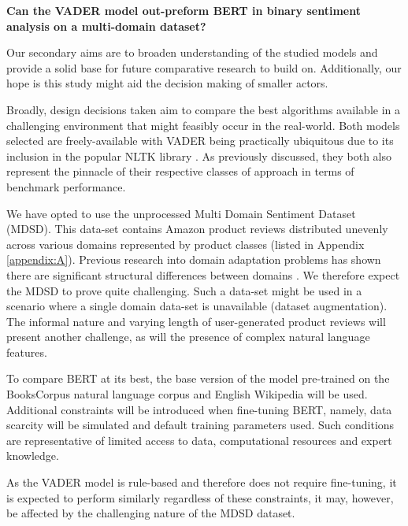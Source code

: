 \documentclass{csfourzero}
\begin{document}
\smallskip
\begin{center}
   \textbf{Can the VADER model out-preform BERT in binary sentiment analysis on a multi-domain dataset?}
\end{center}
\smallskip

Our secondary aims are to broaden understanding of the studied models and provide a solid base for future comparative research to build on. Additionally, our hope is this study might aid the decision making of smaller actors. 

\par
Broadly, design decisions taken aim to compare the best algorithms available in a challenging environment that might feasibly occur in the real-world. Both models selected are freely-available with VADER being practically ubiquitous due to its inclusion in the popular NLTK library \cite{nltk}. As previously discussed, they both also represent the pinnacle of their respective classes of approach in terms of benchmark performance.
\par

We have opted to use the unprocessed Multi Domain Sentiment Dataset (MDSD). This data-set contains Amazon product reviews distributed unevenly across various domains represented by product classes (listed in Appendix \ref{appendix:A}). Previous research into domain adaptation problems has shown there are significant structural differences between domains \cite{domainadaptation}. We therefore expect the MDSD to prove quite challenging. Such a data-set might be used in a scenario where a single domain data-set is unavailable (dataset augmentation). The informal nature and varying length of user-generated product reviews will present another challenge, as will the presence of complex natural language features.
\par
To compare BERT at its best, the base version of the model pre-trained on the BooksCorpus natural language corpus and English Wikipedia \cite{booksCorpus} will be used. Additional constraints will be introduced when fine-tuning BERT, namely, data scarcity will be simulated and default training parameters used. Such conditions are representative of limited access to data, computational resources and expert knowledge. 
\par
As the VADER model is rule-based and therefore does not require fine-tuning, it is expected to perform similarly regardless of these constraints, it may, however, be affected by the challenging nature of the MDSD dataset.

\par
\end{document}
